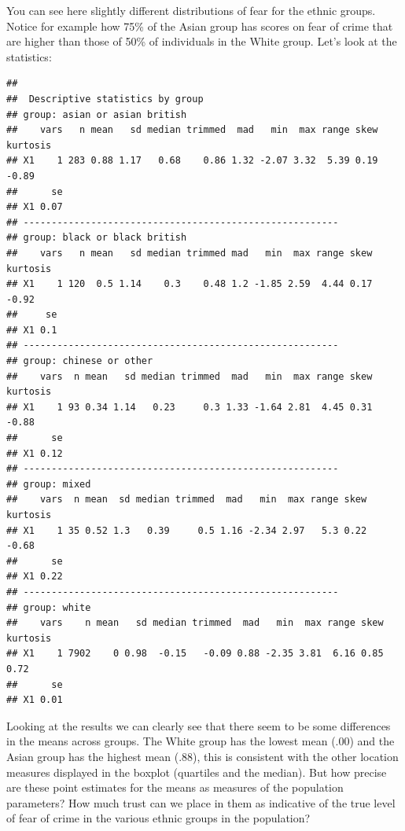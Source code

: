 \documentclass[]{book}
\newenvironment{Shaded}{\begin{snugshade}}{\end{snugshade}}
\newcommand{\KeywordTok}[1]{\textcolor[rgb]{0.13,0.29,0.53}{\textbf{#1}}}
\newcommand{\NormalTok}[1]{#1}
\newcommand{\OperatorTok}[1]{\textcolor[rgb]{0.81,0.36,0.00}{\textbf{#1}}}
\theoremstyle{definition}
\theoremstyle{definition}
\theoremstyle{definition}
\theoremstyle{remark}
\begin{document}
You can see here slightly different distributions of fear for the ethnic
groups. Notice for example how 75\% of the Asian group has scores on
fear of crime that are higher than those of 50\% of individuals in the
White group. Let's look at the statistics:

\begin{Shaded}
\end{Shaded}

\begin{verbatim}
## 
##  Descriptive statistics by group 
## group: asian or asian british
##    vars   n mean   sd median trimmed  mad   min  max range skew kurtosis
## X1    1 283 0.88 1.17   0.68    0.86 1.32 -2.07 3.32  5.39 0.19    -0.89
##      se
## X1 0.07
## -------------------------------------------------------- 
## group: black or black british
##    vars   n mean   sd median trimmed mad   min  max range skew kurtosis
## X1    1 120  0.5 1.14    0.3    0.48 1.2 -1.85 2.59  4.44 0.17    -0.92
##     se
## X1 0.1
## -------------------------------------------------------- 
## group: chinese or other
##    vars  n mean   sd median trimmed  mad   min  max range skew kurtosis
## X1    1 93 0.34 1.14   0.23     0.3 1.33 -1.64 2.81  4.45 0.31    -0.88
##      se
## X1 0.12
## -------------------------------------------------------- 
## group: mixed
##    vars  n mean  sd median trimmed  mad   min  max range skew kurtosis
## X1    1 35 0.52 1.3   0.39     0.5 1.16 -2.34 2.97   5.3 0.22    -0.68
##      se
## X1 0.22
## -------------------------------------------------------- 
## group: white
##    vars    n mean   sd median trimmed  mad   min  max range skew kurtosis
## X1    1 7902    0 0.98  -0.15   -0.09 0.88 -2.35 3.81  6.16 0.85     0.72
##      se
## X1 0.01
\end{verbatim}

Looking at the results we can clearly see that there seem to be some
differences in the means across groups. The White group has the lowest
mean (.00) and the Asian group has the highest mean (.88), this is
consistent with the other location measures displayed in the boxplot
(quartiles and the median). But how precise are these point estimates
for the means as measures of the population parameters? How much trust
can we place in them as indicative of the true level of fear of crime in
the various ethnic groups in the population?
\end{document}
